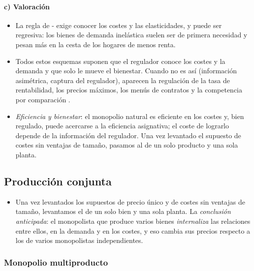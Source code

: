 \documentclass[11pt]{article}
\begin{document}
\paragraph{c) Valoración}

\begin{itemize}
\item La regla de - exige conocer los costes y las elasticidades, y puede ser regresiva: los bienes de demanda inelástica suelen ser de primera necesidad y pesan más en la cesta de los hogares de menos renta.
\item Todos estos esquemas suponen que el regulador conoce los costes y la demanda y que solo le mueve el bienestar. Cuando no es así (información asimétrica, captura del regulador), aparecen la regulación de la tasa de rentabilidad, los precios máximos, los menús de contratos y la competencia por comparación .
\item \emph{Eficiencia y bienestar}: el monopolio natural es eficiente en los costes y, bien regulado, puede acercarse a la eficiencia asignativa; el coste de lograrlo depende de la información del regulador. Una vez levantado el supuesto de costes sin ventajas de tamaño, pasamos al de un solo producto y una sola planta.
\end{itemize}

\subsection{Producción conjunta}\label{sec:produccion-conjunta}

\begin{itemize}
\item Una vez levantados los supuestos de precio único y de costes sin ventajas de tamaño, levantamos el de un solo bien y una sola planta. La \emph{conclusión anticipada}: el monopolista que produce varios bienes \emph{internaliza} las relaciones entre ellos, en la demanda y en los costes, y eso cambia sus precios respecto a los de varios monopolistas independientes.
\end{itemize}

\subsubsection{Monopolio multiproducto}\label{sec:monopolio-multiproducto}
\end{document}
